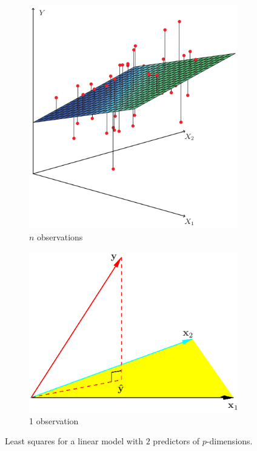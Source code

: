 \begin{center}
\end{center}
\begin{figure}[H]
\centering
\begin{subfigure}{.5\textwidth}
  \centering
	\includegraphics[width=.7\textwidth]{./chap/1chap/2sec/2images/1leastSquaresPlan.png}
  \caption{$n$ observations}
  \label{fig:2.1aLeastSquares}
\end{subfigure}%
\begin{subfigure}{.5\textwidth}
  \centering
	\includegraphics[width=\textwidth]{./chap/1chap/2sec/2images/11projection.png}
\caption{1 observation}
  \label{fig: 2.1bLeastSquares}
\end{subfigure}
  \caption{Least squares for a linear model with $2$ predictors of 
$p$-dimensions.}
\label{fig:test}
\end{figure}

